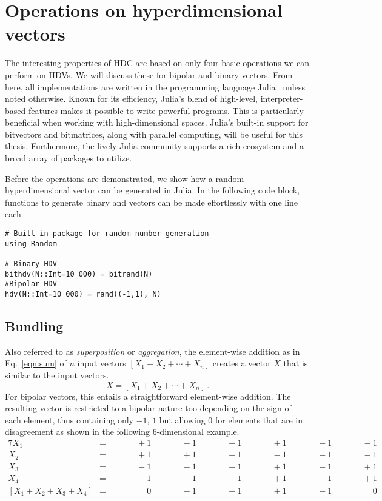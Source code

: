 \section{Operations on hyperdimensional vectors}
The interesting properties of HDC are based on only four basic operations we can perform on HDVs. We will discuss these for bipolar and binary vectors. From here, all implementations are written in the programming language Julia~\cite{Julia} unless noted otherwise. Known for its efficiency, Julia's blend of high-level, interpreter-based features makes it possible to write powerful programs. This is particularly beneficial when working with high-dimensional spaces. Julia's built-in support for bitvectors and bitmatrices, along with parallel computing, will be useful for this thesis. Furthermore, the lively Julia community supports a rich ecosystem and a broad array of packages to utilize.

Before the operations are demonstrated, we show how a random hyperdimensional vector can be generated in Julia. In the following code block, functions to generate binary and vectors can be made effortlessly with one line each.

\begin{verbatim}
# Built-in package for random number generation
using Random

# Binary HDV
bithdv(N::Int=10_000) = bitrand(N) 
#Bipolar HDV
hdv(N::Int=10_000) = rand((-1,1), N)
\end{verbatim}

\subsection*{Bundling} \label{sssec:add}
Also referred to as \textit{superposition} or \textit{aggregation}, the element-wise addition as in Eq.~\ref{eqn:sum} of $n$ input vectors $[X_{1} + X_{2} + \cdots + X_{n}]$ creates a vector $X$ that is similar to the input vectors.
\begin{equation}
    \label{eqn:sum}
    X = [X_{1} + X_{2} + \cdots + X_{n}]\,.
\end{equation}
For bipolar vectors, this entails a straightforward element-wise addition. The resulting vector is restricted to a bipolar nature too depending on the sign of each element, thus containing only $-1$, $1$ but allowing $0$ for elements that are in disagreement as shown in the following $6$-dimensional example.
\begin{alignat*}{7}
    X_{1} &= && \qquad +1 && \qquad -1 && \qquad +1 && \qquad +1 && \qquad -1 && \qquad -1 \\
    X_{2} &= && \qquad +1 && \qquad +1 && \qquad +1 && \qquad -1 && \qquad -1 && \qquad -1 \\
    X_{3} &= && \qquad -1 && \qquad -1 && \qquad +1 && \qquad +1 && \qquad -1 && \qquad +1 \\
    X_{4} &= && \qquad -1 && \qquad -1 && \qquad -1 && \qquad +1 && \qquad -1 && \qquad +1 \\
    \hline
    [X_{1} + X_{2} + X_{3} + X_{4}] &= && \qquad \phantom{-}0 && \qquad -1 && \qquad +1 && \qquad +1 && \qquad -1 && \qquad \phantom{-}0
\end{alignat*}

